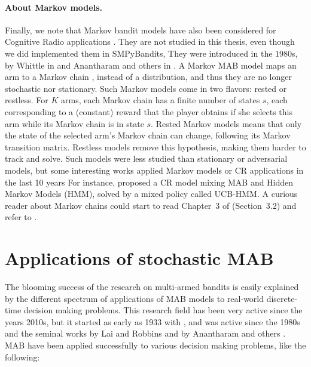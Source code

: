 \paragraph{About Markov models.}
%
Finally, we note that Markov bandit models have also been considered for Cognitive Radio applications \cite{Liu08}.
They are not studied in this thesis, even though we did implemented them in SMPyBandits,
They were introduced in the $1980$s, by Whittle in \cite{Whittle1988} and Anantharam and others in \cite{Anantharam87b}.
A Markov MAB model maps an arm to a Markov chain \cite{Norris98}, instead of a distribution, and thus they are no longer stochastic nor stationary.
Such Markov models come in two flavors: rested or restless.
For $K$ arms, each Markov chain has a finite number of states $s$, each corresponding to a (constant) reward that the player obtains if she selects this arm while its Markov chain is in state $s$.
Rested Markov models means that only the state of the selected arm's Markov chain can change, following its Markov transition matrix.
Restless models remove this hypothesis, making them harder to track and solve.
%
Such models were less studied than stationary or adversarial models, but some interesting works applied Markov models or CR applications in the last 10 years
For instance, \cite{Melian15} proposed a CR model mixing MAB and Hidden Markov Models (HMM), solved by a mixed policy called UCB-HMM.
A curious reader about Markov chains could start to read Chapter~3 of \cite{LattimoreBanditAlgorithmsBook} (Section~3.2) and refer to \cite{Norris98}.


\section{Applications of stochastic MAB}
\label{sec:2:applicationsofStochasticMAB}

The blooming success of the research on multi-armed bandits is easily explained by the different spectrum of applications of MAB models to real-world discrete-time decision making problems.
This research field has been very active since the years 2010s, but it started as early as 1933 with \cite{Thompson33}, and was active since the 1980s and the seminal works by Lai and Robbins \cite{LaiRobbins85} and by Anantharam and others \cite{Anantharam87a}.
%
MAB have been applied successfully to various decision making problems, like the following:

